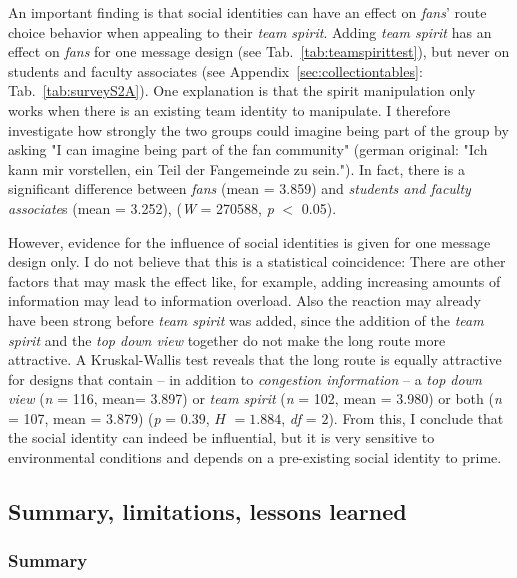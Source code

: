 An important finding is that social identities can have an effect on \textit{fans}' route choice behavior when appealing to their \textit{team spirit}.
Adding \textit{team spirit} has an effect on \textit{fans} for one message design (see Tab.~\ref{tab:teamspirittest}), but never on students and faculty associates (see  Appendix~\ref{sec:collectiontables}: Tab.~\ref{tab:surveyS2A}). 
One explanation is that the spirit manipulation only works when there is an existing team identity to manipulate. I therefore investigate how strongly the two groups could imagine being part of the group by asking "I can imagine being part of the fan community" (german original: "Ich kann mir vorstellen, ein Teil der Fangemeinde zu sein.").
In fact, there is a significant difference between \textit{fans} (mean = 3.859) and \textit{students and faculty associate}s (mean = 3.252), (\textit{W} = 270588, \textit{p} $<$ 0.05). 

However, evidence for the influence of social identities is given for one message design only. I do not believe that this is a statistical coincidence: There are other factors that may mask the effect like, for example, adding increasing amounts of information  may lead to information overload. Also the reaction may already have been strong before \textit{team spirit} was added, since the addition of the \textit{team spirit} and the \textit{top down view} together do not make the long route more attractive.
A Kruskal-Wallis test reveals that the long route is equally attractive for designs that contain -- in addition to \textit{congestion information} -- a \textit{top down view} (\textit{n} = 116, mean= 3.897) or \textit{team spirit} (\textit{n} = 102, mean = 3.980) or both (\textit{n} = 107, mean = 3.879)  (\textit{p} = $0.39$,  $H$ $= 1.884$, \textit{df} = $2$). From this, I conclude that the social identity can indeed be influential, but it is very sensitive to environmental conditions and depends on a pre-existing social identity to prime.


\FloatBarrier

\subsection{Summary, limitations, lessons learned}

\subsubsection{Summary}

